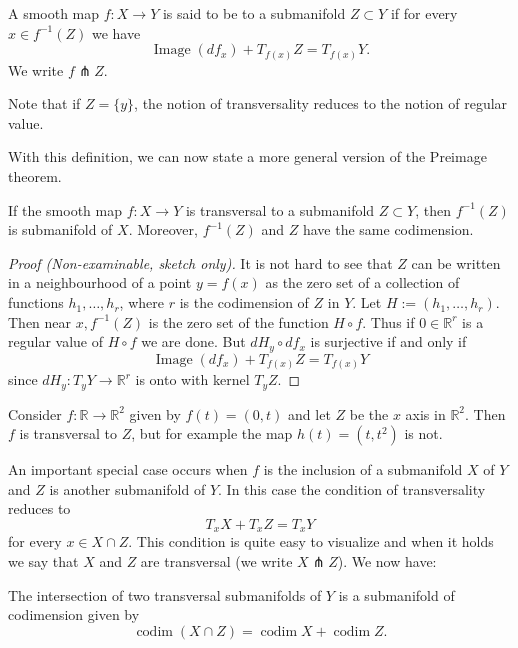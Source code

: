 \documentclass[a4paper, 10pt, twocolumn]{amsart}
\begin{document}
\begin{definition}[Transversal]
    A smooth map $f: X \rightarrow Y$ is said to be  to a submanifold $Z \subset Y$ if for every $x \in f^{-1}(Z)$ we have
$$
\operatorname{Image}\left(d f_{x}\right)+T_{f(x)} Z=T_{f(x)} Y.
$$
We write $f \pitchfork Z$.
\end{definition}

Note that if $Z=\{y\}$, the notion of transversality reduces to the notion of regular value.

With this definition, we can now state a more general version of the Preimage theorem.

\begin{theorem}
    If the smooth map $f: X \rightarrow Y$ is transversal to a submanifold $Z \subset Y$, then $f^{-1}(Z)$ is submanifold of $X$. Moreover, $f^{-1}(Z)$ and $Z$ have the same codimension.
\end{theorem}
\begin{proof}[Proof (Non-examinable, sketch only)]
    It is not hard to see that $Z$ can be written in a neighbourhood of a point $y=f(x)$ as the zero set of a collection of functions $h_{1}, \ldots, h_{r}$, where $r$ is the codimension of $Z$ in $Y$. Let $H:=\left(h_{1}, \ldots, h_{r}\right)$. Then near $x, f^{-1}(Z)$ is the zero set of the function $H \circ f$. Thus if $0 \in \mathbb{R}^{r}$ is a regular value of $H \circ f$ we are done. But $d H_{y} \circ d f_{x}$ is surjective if and only if
    $$
    \operatorname{Image}\left(d f_{x}\right)+T_{f(x)} Z=T_{f(x)} Y
    $$
    since $d H_{y}: T_{y} Y \rightarrow \mathbb{R}^{r}$ is onto with kernel $T_{y} Z$.
\end{proof}

\begin{example}
    Consider $f: \mathbb{R} \rightarrow \mathbb{R}^{2}$ given by $f(t)=(0, t)$ and let $Z$ be the $x$ axis in $\mathbb{R}^{2}$. Then $f$ is transversal to $Z$, but for example the map $h(t)=\left(t, t^{2}\right)$ is not.
\end{example}

An important special case occurs when $f$ is the inclusion of a submanifold $X$ of $Y$ and $Z$ is another submanifold of $Y$. In this case the condition of transversality reduces to
$$
T_{x} X+T_{x} Z=T_{x} Y
$$
for every $x \in X \cap Z$. This condition is quite easy to visualize and when it holds we say that $X$ and $Z$ are transversal (we write $X \pitchfork Z$). We now have:

\begin{theorem}
    The intersection of two transversal submanifolds of $Y$ is a submanifold of codimension given by
$$
\operatorname{codim}(X \cap Z)=\operatorname{codim} X+\operatorname{codim} Z.
$$
\end{theorem}
\end{document}
